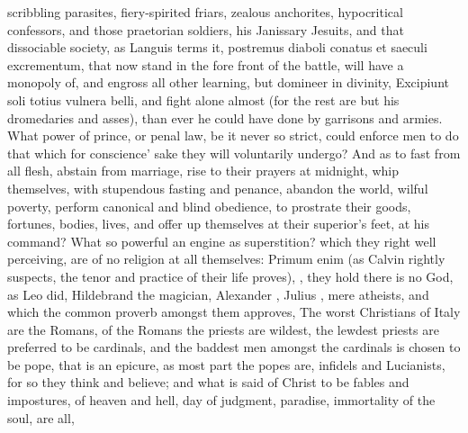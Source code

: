 {scribbling parasites, fiery-spirited friars, zealous anchorites,
hypocritical confessors, and those praetorian soldiers, his Janissary
Jesuits, and that dissociable society, as Languis terms it,
postremus diaboli conatus et saeculi excrementum, that now stand in the
fore front of the battle, will have a monopoly of, and engross all
other learning, but domineer in divinity, Excipiunt soli totius
vulnera belli, and fight alone almost (for the rest are but his
dromedaries and asses), than ever he could have done by garrisons and
armies. What power of prince, or penal law, be it never so strict,
could enforce men to do that which for conscience' sake they will
voluntarily undergo? And as to fast from all flesh, abstain from
marriage, rise to their prayers at midnight, whip themselves, with
stupendous fasting and penance, abandon the world, wilful poverty,
perform canonical and blind obedience, to prostrate their goods,
fortunes, bodies, lives, and offer up themselves at their superior's
feet, at his command? What so powerful an engine as superstition? which
they right well perceiving, are of no religion at all themselves:
Primum enim (as Calvin rightly suspects, the tenor and practice of
their life proves), , they hold there is no God, as Leo  did,
Hildebrand the magician, Alexander , Julius , mere atheists, and
which the common proverb amongst them approves, The worst
Christians of Italy are the Romans, of the Romans the priests are
wildest, the lewdest priests are preferred to be cardinals, and the
baddest men amongst the cardinals is chosen to be pope, that is an
epicure, as most part the popes are, infidels and Lucianists, for so
they think and believe; and what is said of Christ to be fables and
impostures, of heaven and hell, day of judgment, paradise, immortality
of the soul, are all,

}
